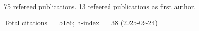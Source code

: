 75 refereed publications. 13 refeered publications as first author.

Total citations~=~5185; h-index~=~38 (2025-09-24)